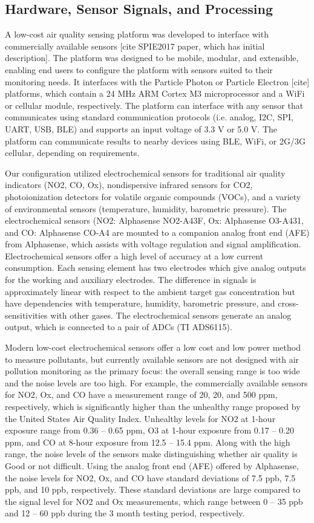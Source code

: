 \documentclass[journal abbreviation, manuscript]{copernicus}
\begin{document}
\subsection{Hardware, Sensor Signals, and Processing}

A low-cost air quality sensing platform was developed to interface with commercially available sensors [cite SPIE2017 paper, which has initial description]. The platform was designed to be mobile, modular, and extensible, enabling end users to configure the platform with sensors suited to their monitoring needs. It interfaces with the Particle Photon or Particle Electron [cite] platforms, which contain a 24 MHz ARM Cortex M3 microprocessor and a WiFi or cellular module, respectively. The platform can interface with any sensor that communicates using standard communication protocols (i.e. analog, I2C, SPI, UART, USB, BLE) and supports an input voltage of 3.3 V or 5.0 V. The platform can communicate results to nearby devices using BLE, WiFi, or 2G/3G cellular, depending on requirements.

Our configuration utilized electrochemical sensors for traditional air quality indicators (NO2, CO, Ox), nondispersive infrared sensors for CO2, photoionization detectors for volatile organic compounds (VOCs), and a variety of environmental sensors (temperature, humidity, barometric pressure). The electrochemical sensors (NO2: Alphasense NO2-A43F, Ox: Alphasense O3-A431, and CO: Alphasense CO-A4 are mounted to a companion analog front end (AFE) from Alphasense, which assists with voltage regulation and signal amplification. Electrochemical sensors offer a high level of accuracy at a low current consumption. Each sensing element has two electrodes which give analog outputs for the working and auxiliary electrodes. The difference in signals is approximately linear with respect to the ambient target gas concentration but have dependencies with temperature, humidity, barometric pressure, and cross-sensitivities with other gases. The electrochemical sensors generate an analog output, which is connected to a pair of ADCs (TI ADS6115). 

Modern low-cost electrochemical sensors offer a low cost and low power method to measure pollutants, but currently available sensors are not designed with air pollution monitoring as the primary focus: the overall sensing range is too wide and the noise levels are too high. For example, the commercially available sensors for NO2, Ox, and CO have a measurement range of 20, 20, and 500 ppm, respectively, which is significantly higher than the unhealthy range proposed by the United States Air Quality Index. Unhealthy levels for NO2 at 1-hour exposure range from 0.36 – 0.65 ppm, O3 at 1-hour exposure from 0.17 – 0.20 ppm, and CO at 8-hour exposure from 12.5 – 15.4 ppm. Along with the high range, the noise levels of the sensors make distinguishing whether air quality is Good or not difficult. Using the analog front end (AFE) offered by Alphasense, the noise levels for NO2, Ox, and CO have standard deviations of 7.5 ppb, 7.5 ppb, and 10 ppb, respectively. These standard deviations are large compared to the signal level for NO2 and Ox measurements, which range between 0 – 35 ppb and 12 – 60 ppb during the 3 month testing period, respectively.
\end{document}
